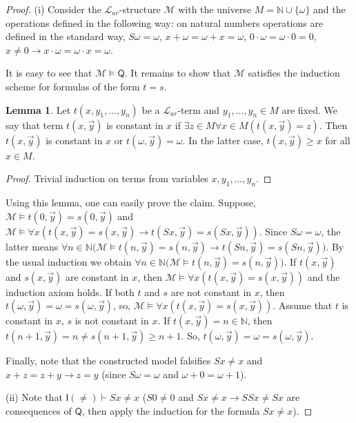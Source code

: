 \documentclass[a4paper,14pt]{article}
\theoremstyle{definition}
\theoremstyle{theorem}
\theoremstyle{lemma}
\newtheorem{lemma}{Lemma}[section]
\theoremstyle{proposition}
\theoremstyle{remark}
\theoremstyle{corollary}
\theoremstyle{problem}
\theoremstyle{hypothesis}
\begin{document}
\begin{proof}
    (i) Consider the $\mathcal L_{ar}$-structure $\mathcal M$ with the universe $M = \mathbb N \cup \{\omega\}$ and the operations defined in the following way: on natural numbers operations are defined in the standard way, $S\omega = \omega$, $x + \omega = \omega + x = \omega$, $0 \cdot \omega = \omega \cdot 0 = 0$, $x \ne 0 \rightarrow x \cdot \omega = \omega \cdot x = \omega$.
    
    It is easy to see that $\mathcal M \vDash \mathsf Q$. It remains to show that $\mathcal M$ satisfies the induction scheme for formulas of the form $t = s$.
    
    \begin{lemma}
        Let $t(x, y_1, \dots, y_n)$ be a $\mathcal L_{ar}$-term and $y_1, \dots, y_n \in M$ are fixed. We say that term $t(x, \vec y)$ is constant in $x$ if $\exists z \in M \forall x \in M (t(x, \vec y) = z)$. Then $t(x, \vec y)$ is constant in $x$ or $t(\omega, \vec y) = \omega$. In the latter case, $t(x, \vec y) \geqslant x$ for all $x \in M$.
    \end{lemma}
    
    \begin{proof}
        Trivial induction on terms from variables $x, y_1, \dots, y_n$.
    \end{proof}
    
    Using this lemma, one can easily prove the claim. Suppose, $\mathcal M \vDash t(0, \vec y) = s(0, \vec y)$ and $\mathcal M \vDash \forall x (t(x, \vec y) = s(x, \vec y) \rightarrow t(Sx, \vec y) = s(Sx, \vec y))$. Since $S\omega = \omega$, the latter means $\forall n \in \mathbb N \Big(\mathcal M \vDash t(n, \vec y) = s(n, \vec y) \rightarrow t(Sn, \vec y) = s(Sn, \vec y) \Big)$. By the usual induction we obtain $\forall n \in \mathbb N \Big(\mathcal M \vDash t(n, \vec y) = s(n, \vec y)\Big)$. If $t(x, \vec y)$ and $s(x, \vec y)$ are constant in $x$, then $\mathcal M \vDash \forall x (t(x, \vec y) = s(x, \vec y))$ and the induction axiom holds. If both $t$ and $s$ are not constant in $x$, then $t(\omega, \vec y) = \omega = s(\omega, \vec y)$, so, $\mathcal M \vDash \forall x (t(x, \vec y) = s(x, \vec y))$. Assume that $t$ is constant in $x$, $s$ is not constant in $x$. If $t(x, \vec y) = n \in \mathbb N$, then $t(n + 1, \vec y) = n \ne s(n + 1, \vec y) \geqslant n + 1$. So, $t(\omega, \vec y) = \omega = s(\omega, \vec y)$. 
    
    Finally, note that the constructed model falsifies $Sx \ne x$ and $x + z = z + y \rightarrow z = y$ (since $S\omega = \omega$ and $\omega + 0 = \omega + 1$).
    
    (ii) Note that $\mathsf I(\ne) \vdash Sx \ne x$ ($S0 \ne 0$ and $Sx \ne x \rightarrow SSx \ne Sx$ are consequences of $\mathsf{Q}$, then apply the induction for the formula $Sx \ne x$). 
\end{proof}
\end{document}
